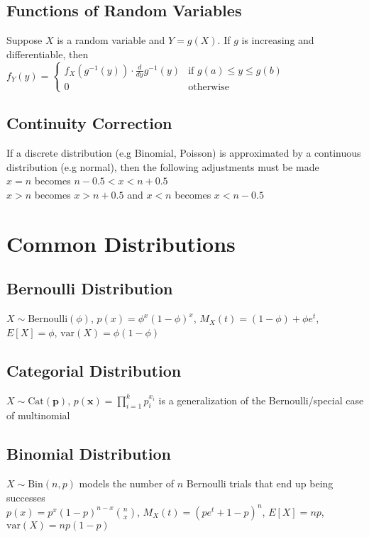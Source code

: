 \documentclass{article}
\newcommand{\V}{\mbox{var}}
\begin{document}
\subsection{Functions of Random Variables}
Suppose $X$ is a random variable and $Y=g(X)$. If $g$ is increasing and differentiable, then \\
$f_Y(y) = \begin{cases} f_X(g^{-1}(y)) \cdot \frac{d}{dy}g^{-1}(y) & \text{if } g(a) \leq y \leq g(b) \\ 
0 & \text{otherwise} \end{cases}$

\subsection{Continuity Correction}
If a discrete distribution (e.g Binomial, Poisson) is approximated by a continuous distribution (e.g normal), then the following adjustments must be made  \\
$x = n$ becomes $n-0.5 < x < n + 0.5$ \\
$x > n$ becomes $x > n + 0.5$ and $x < n $ becomes $x < n - 0.5$ 

\section{Common Distributions}
\subsection{Bernoulli Distribution}
$X\sim \mbox{Bernoulli}(\phi)$, $p(x) = \phi^x(1-\phi)^x$, $M_X(t) = (1-\phi) + \phi e^t$, $E[X] = \phi$, $\V(X) = \phi(1-\phi)$

\subsection{Categorial Distribution}
$X\sim \mbox{Cat}(\boldsymbol p)$, $p(\boldsymbol x) = \prod\limits_{i=1}^kp_i^{x_i}$ is a generalization of the Bernoulli/special case of multinomial

\subsection{Binomial Distribution}
$X\sim \mbox{Bin}(n, p)$ models the number of $n$ Bernoulli trials that end up being successes \\
$p(x) = p^x(1-p)^{n-x}\binom{n}{x}$, $M_X(t) = (pe^t + 1 - p)^n$, $E[X] = np$, $\V(X) = np(1-p)$
\end{document}
